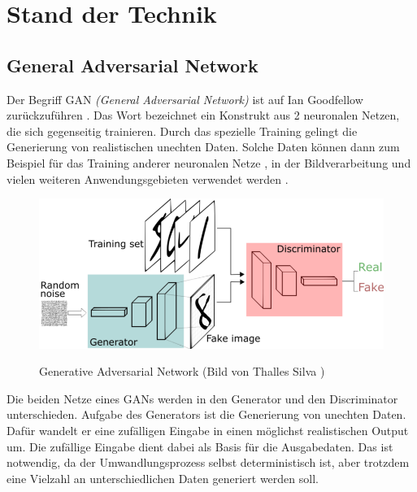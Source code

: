 
\chapter{Stand der Technik}

\section{General Adversarial Network}
Der Begriff GAN \textit{(General Adversarial Network)} ist auf Ian Goodfellow zurückzuführen \cite{gan-original-paper}.
Das Wort bezeichnet ein Konstrukt aus 2 neuronalen Netzen, die sich gegenseitig trainieren.
Durch das spezielle Training gelingt die Generierung von realistischen unechten Daten.
Solche Daten können dann zum Beispiel für das Training anderer neuronalen Netze \cite{gan-application-augmenting-training-data}, in der Bildverarbeitung \cite{gan-application-upscaling, gan-application-blending} und vielen weiteren Anwendungsgebieten verwendet werden \cite{gan-application-dna-optimizes-protein-functions, gan-application-audio-synthesis}.

\begin{figure}[H]
	\centering
	\includegraphics[width=12cm]{kapitel/2_stand_der_technik/img/GAN.png}
	\label{img:gan}
	\caption{Generative Adversarial Network (Bild von Thalles Silva \cite{img-gan})}
\end{figure}

Die beiden Netze eines GANs werden in den Generator und den Discriminator unterschieden.
Aufgabe des Generators ist die Generierung von unechten Daten.
Dafür wandelt er eine zufälligen Eingabe in einen möglichst realistischen Output um.
Die zufällige Eingabe dient dabei als Basis für die Ausgabedaten.
Das ist notwendig, da der Umwandlungsprozess selbst deterministisch ist, aber trotzdem eine Vielzahl an unterschiedlichen Daten generiert werden soll.
\newline

